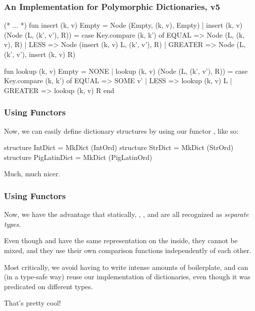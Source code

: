 \documentclass[aspectratio=169, handout]{beamer}
\begin{document}
\begin{frame}[fragile]
  \frametitle{An Implementation for Polymorphic Dictionaries, v5}

  {\small
  \begin{codeblock}
    (* ... *)
      fun insert (k, v) Empty = Node (Empty, (k, v), Empty)
        | insert (k, v) (Node (L, (k', v'), R)) =
            case Key.compare (k, k') of
              EQUAL   => Node (L, (k, v), R)
            | LESS    => Node (insert (k, v) L, (k', v'), R)
            | GREATER => Node (L, (k', v'), insert (k, v) R)

      fun lookup (k, v) Empty = NONE
        | lookup (k, v) (Node (L, (k', v'), R)) =
            case Key.compare (k, k') of
              EQUAL   => SOME v'
            | LESS    => lookup (k, v) L
            | GREATER => lookup (k, v) R
    end
  \end{codeblock}
  }

\end{frame}

\begin{frame}[fragile]
  \frametitle{Using Functors}

  Now, we can easily define dictionary structures by using our functor
  , like so:
  \pause

  \begin{codeblock}
    structure IntDict      = MkDict (IntOrd)
    structure StrDict      = MkDict (StrOrd)
    structure PigLatinDict = MkDict (PigLatinOrd)
  \end{codeblock}

  \pause
  \vspace{\fill}

  Much, much nicer.
\end{frame}

\begin{frame}[fragile]
  \frametitle{Using Functors}

  Now, we have the advantage that statically, ,
  , and  are all recognized as
  \textit{separate types}.

  \pause
  \vspace{\fill}

  Even though  and  have the same
  representation on the inside, they cannot be mixed, and they use
  their own comparison functions independently of each other.

  \pause
  \vspace{\fill}

  Most critically, we avoid having to write intense amounts of boilerplate,
  and can (in a type-safe way) reuse our implementation of dictionaries,
  even though it was predicated on different types.

  \vspace{\fill}

  That's pretty cool!


\end{frame}
\end{document}
